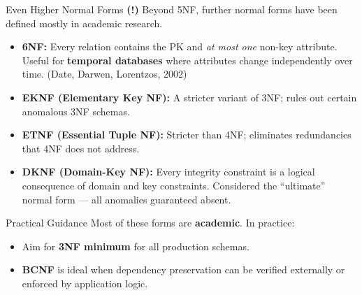 \begin{frame}{Even Higher Normal Forms \textbf{(!)}}
  Beyond 5NF, further normal forms have been defined mostly in academic research.

  \begin{itemize}
    \item \textbf{6NF:} Every relation contains the PK and \emph{at most one}
          non-key attribute.  Useful for \textbf{temporal databases} where
          attributes change independently over time.
          (Date, Darwen, Lorentzos, 2002)
    \item \textbf{EKNF (Elementary Key NF):} A stricter variant of 3NF;
          rules out certain anomalous 3NF schemas.
    \item \textbf{ETNF (Essential Tuple NF):} Stricter than 4NF; eliminates
          redundancies that 4NF does not address.
    \item \textbf{DKNF (Domain-Key NF):} Every integrity constraint is a logical
          consequence of domain and key constraints.  Considered the
          ``ultimate'' normal form --- all anomalies guaranteed absent.
  \end{itemize}

  \begin{alertblock}{Practical Guidance}
    Most of these forms are \textbf{academic}.  In practice:
    \begin{itemize}
      \item Aim for \textbf{3NF minimum} for all production schemas.
      \item \textbf{BCNF} is ideal when dependency preservation can be
            verified externally or enforced by application logic.
    \end{itemize}
  \end{alertblock}
\end{frame}

